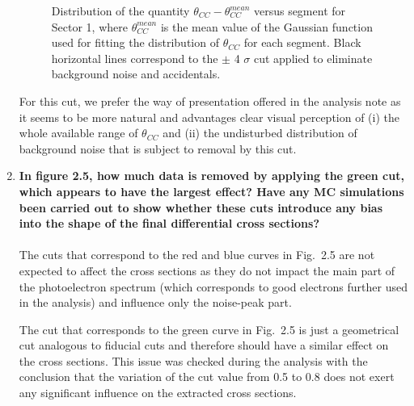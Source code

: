 \documentclass[,superscriptaddress,showpacs,amssymb,amsmath,amsfonts,linenumbers,article]{revtex4-1}
\begin{document}
\begin{enumerate}[label=\textbf{\arabic*}.]
\begin{figure}[htp]
\begin{center}
\caption{\small Distribution of the quantity $\theta_{CC} - \theta_{CC}^{mean}$ versus segment for Sector 1, where $\theta_{CC}^{mean}$ is the mean value of the Gaussian function used for fitting the distribution of $\theta_{CC}$ for each segment. Black horizontal lines correspond to the $\pm$ 4 $\sigma$ cut applied to eliminate background noise and accidentals.}  \label{fig:cc_plane_def}
\end{center}
\end{figure}

For this cut, we prefer the way of presentation offered in the analysis note as it seems to be more natural and advantages clear visual perception of (i) the whole available range of $\theta_{CC}$ and (ii) the undisturbed distribution of background noise that is subject to removal by this cut.

\item {\bf In figure 2.5, how much data is removed by applying the green cut, which appears to have the largest effect? Have any MC simulations been carried out to show whether these cuts introduce any bias into the shape of the final differential cross sections?}\\ \\
The cuts that correspond to the red and blue curves in Fig.~2.5 are not expected to affect the cross sections as they do not impact the main part of the photoelectron spectrum (which corresponds to good electrons further used in the analysis) and influence only the noise-peak part. 

The cut that corresponds to the green curve in Fig.~2.5 is just a geometrical cut analogous to fiducial cuts and therefore should have a similar effect on the cross sections. This issue was checked during the analysis with the conclusion that the variation of the cut value from 0.5 to 0.8 does not exert any significant influence on the extracted cross sections.


\end{enumerate}
\end{document}
